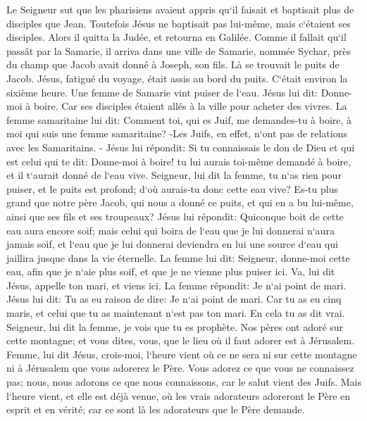 \verse Le Seigneur sut que les pharisiens avaient appris qu`il faisait et baptisait plus de disciples que Jean. 
\verse Toutefois Jésus ne baptisait pas lui-même, mais c`étaient ses disciples. 
\verse Alors il quitta la Judée, et retourna en Galilée. 
\verse Comme il fallait qu`il passât par la Samarie, 
\verse il arriva dans une ville de Samarie, nommée Sychar, près du champ que Jacob avait donné à Joseph, son fils. 
\verse Là se trouvait le puits de Jacob. Jésus, fatigué du voyage, était assis au bord du puits. C`était environ la sixième heure. 
\verse Une femme de Samarie vint puiser de l`eau. Jésus lui dit: Donne-moi à boire. 
\verse Car ses disciples étaient allés à la ville pour acheter des vivres. 
\verse La femme samaritaine lui dit: Comment toi, qui es Juif, me demandes-tu à boire, à moi qui suis une femme samaritaine? -Les Juifs, en effet, n`ont pas de relations avec les Samaritains. - 
\verse Jésus lui répondit: Si tu connaissais le don de Dieu et qui est celui qui te dit: Donne-moi à boire! tu lui aurais toi-même demandé à boire, et il t`aurait donné de l`eau vive. 
\verse Seigneur, lui dit la femme, tu n`as rien pour puiser, et le puits est profond; d`où aurais-tu donc cette eau vive? 
\verse Es-tu plus grand que notre père Jacob, qui nous a donné ce puits, et qui en a bu lui-même, ainsi que ses fils et ses troupeaux? 
\verse Jésus lui répondit: Quiconque boit de cette eau aura encore soif; 
\verse mais celui qui boira de l`eau que je lui donnerai n`aura jamais soif, et l`eau que je lui donnerai deviendra en lui une source d`eau qui jaillira jusque dans la vie éternelle. 
\verse La femme lui dit: Seigneur, donne-moi cette eau, afin que je n`aie plus soif, et que je ne vienne plus puiser ici. 
\verse Va, lui dit Jésus, appelle ton mari, et viens ici. 
\verse La femme répondit: Je n`ai point de mari. Jésus lui dit: Tu as eu raison de dire: Je n`ai point de mari. 
\verse Car tu as eu cinq maris, et celui que tu as maintenant n`est pas ton mari. En cela tu as dit vrai. 
\verse Seigneur, lui dit la femme, je vois que tu es prophète. 
\verse Nos pères ont adoré sur cette montagne; et vous dites, vous, que le lieu où il faut adorer est à Jérusalem. 
\verse Femme, lui dit Jésus, crois-moi, l`heure vient où ce ne sera ni sur cette montagne ni à Jérusalem que vous adorerez le Père. 
\verse Vous adorez ce que vous ne connaissez pas; nous, nous adorons ce que nous connaissons, car le salut vient des Juifs. 
\verse Mais l`heure vient, et elle est déjà venue, où les vrais adorateurs adoreront le Père en esprit et en vérité; car ce sont là les adorateurs que le Père demande. 
